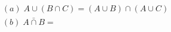 \documentclass[10pt]{article}
\begin{document}
\begin{align*}(a) \; A\cup\left( B \cap C \right)=\left( A \cup B \right)\cap\left( A \cup C \right) \\
(b)\;\bar{A\cap B}= 
\end{align*}
\end{document}
